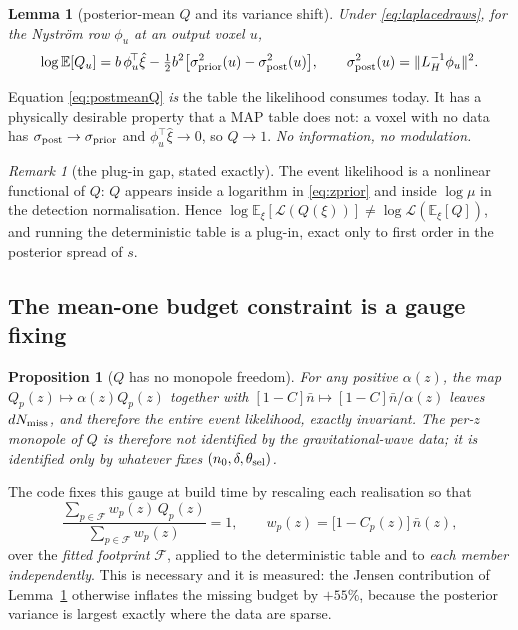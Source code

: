 \documentclass[11pt]{article}
\newtheorem{proposition}{Proposition}
\newtheorem{lemma}{Lemma}
\theoremstyle{definition}
\theoremstyle{remark}
\newtheorem{remark}{Remark}
\newcommand{\nbar}{\bar n}
\begin{document}
\begin{lemma}[posterior-mean $Q$ and its variance shift]
\label{lem:varshift}
Under \eqref{eq:laplacedraws}, for the Nystr\"om row $\phi_u$ at an output voxel
$u$,
\begin{equation}
  \log\mathbb E[Q_u]
  =b\,\phi_u^{\!\top}\hat\xi-\tfrac12b^2\big[\sigma^2_{\rm prior}(u)-\sigma^2_{\rm post}(u)\big],
  \qquad \sigma^2_{\rm post}(u)=\|L_H^{-1}\phi_u\|^2 .
  \label{eq:postmeanQ}
\end{equation}
\end{lemma}
\noindent Equation \eqref{eq:postmeanQ} \emph{is} the table the likelihood consumes
today. It has a physically desirable property that a MAP table does not: a voxel
with no data has $\sigma_{\rm post}\to\sigma_{\rm prior}$ and
$\phi_u^{\!\top}\hat\xi\to0$, so $Q\to1$. \emph{No information, no modulation.}

\begin{remark}[the plug-in gap, stated exactly]
\label{rem:plugin}
The event likelihood is a nonlinear functional of $Q$: $Q$ appears inside a
logarithm in \eqref{eq:zprior} and inside $\log\mu$ in the detection
normalisation. Hence $\log\mathbb E_\xi[\mathcal L(Q(\xi))]\neq
\log\mathcal L(\mathbb E_\xi[Q])$, and running the deterministic table is a
plug-in, exact only to first order in the posterior spread of $s$.
\end{remark}

\subsection{The mean-one budget constraint is a gauge fixing}

\begin{proposition}[$Q$ has no monopole freedom]
\label{prop:gauge}
For any positive $\alpha(z)$, the map $Q_p(z)\mapsto\alpha(z)Q_p(z)$ together with
$[1-C]\nbar\mapsto[1-C]\nbar/\alpha(z)$ leaves $dN_{\rm miss}$, and therefore the
entire event likelihood, exactly invariant. The per-$z$ monopole of $Q$ is
therefore not identified by the gravitational-wave data; it is identified only by
whatever fixes $(n_0,\delta,\theta_{\rm sel})$.
\end{proposition}

The code fixes this gauge at build time by rescaling each realisation so that
\begin{equation}
  \frac{\sum_{p\in\mathcal F}w_p(z)\,Q_p(z)}{\sum_{p\in\mathcal F}w_p(z)}=1,
  \qquad w_p(z)=\big[1-C_p(z)\big]\,\nbar(z),
  \label{eq:renorm}
\end{equation}
over the \emph{fitted footprint} $\mathcal F$, applied
to the deterministic table and to \emph{each member independently}. This is
necessary and it is measured: the Jensen contribution of
Lemma~\ref{lem:varshift} otherwise inflates the missing budget by $+55\%$, because
the posterior variance is largest exactly where the data are sparse.
\end{document}
